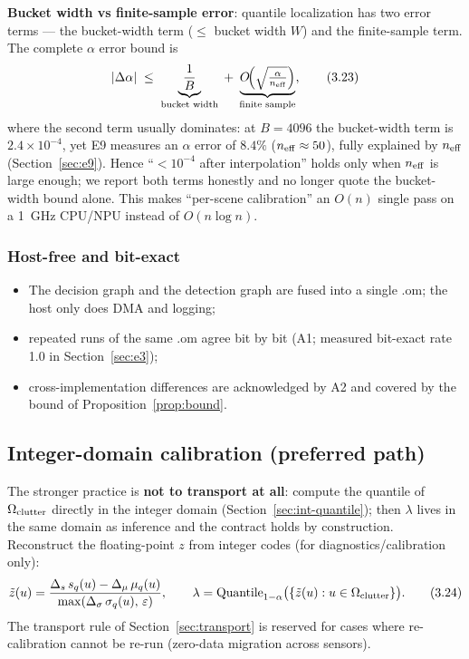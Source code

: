 \textbf{Bucket width vs finite-sample error}: quantile localization has two error terms --- the bucket-width term ($\le$ bucket width $W$) and the finite-sample term.
The complete $\alpha$ error bound is
\begin{equation}
|\Delta\alpha|\;\le\;\underbrace{\frac{1}{B}}_{\text{bucket width}}\;+\;\underbrace{O\!\Big(\sqrt{\tfrac{\alpha}{n_{\mathrm{eff}}}}\Big)}_{\text{finite sample}},
\tag{3.23}
\label{eq:quantile-err}
\end{equation}
where the second term usually dominates: at $B=4096$ the bucket-width term is $2.4\times10^{-4}$, yet E9 measures an $\alpha$ error of $8.4\%$ ($n_{\mathrm{eff}}\approx50$), fully explained by $n_{\mathrm{eff}}$ (Section~\ref{sec:e9}).
Hence ``$<10^{-4}$ after interpolation'' holds only when $n_{\mathrm{eff}}$ is large enough; we report both terms honestly and no longer quote the bucket-width bound alone.
This makes ``per-scene calibration'' an $O(n)$ single pass on a 1~GHz CPU/NPU instead of $O(n\log n)$.

\subsubsection{Host-free and bit-exact}
\label{sec:hostfree}

\begin{itemize}
\item The decision graph and the detection graph are fused into a single .om; the host only does DMA and logging;
\item repeated runs of the same .om agree bit by bit (A1; measured bit-exact rate 1.0 in Section~\ref{sec:e3});
\item cross-implementation differences are acknowledged by A2 and covered by the bound of Proposition~\ref{prop:bound}.
\end{itemize}

\subsection{Integer-domain calibration (preferred path)}
\label{sec:int-calib}

The stronger practice is \textbf{not to transport at all}: compute the quantile of $\Omega_{\mathrm{clutter}}$ directly in the integer domain (Section~\ref{sec:int-quantile}); then $\lambda$ lives in the same domain as inference and the contract holds by construction.
Reconstruct the floating-point $z$ from integer codes (for diagnostics/calibration only):
\begin{equation}
\tilde z(u)=\frac{\Delta_s\,s_q(u)-\Delta_\mu\,\mu_q(u)}{\max(\Delta_\sigma\,\sigma_q(u),\,\varepsilon)},
\qquad
\lambda=\mathrm{Quantile}_{1-\alpha}\big(\{\tilde z(u):u\in\Omega_{\mathrm{clutter}}\}\big).
\tag{3.24}
\label{eq:int-calib}
\end{equation}
The transport rule of Section~\ref{sec:transport} is reserved for cases where re-calibration cannot be re-run (zero-data migration across sensors).

